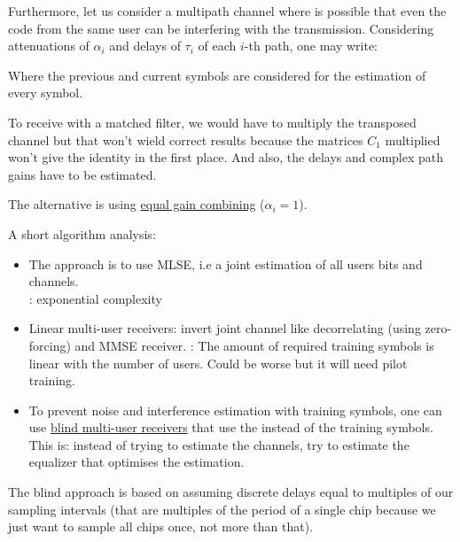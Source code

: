 \documentclass[12pt, a4paper]{article}
\begin{document}
\vspace{.5cm}

\par Furthermore, let us consider a multipath channel where is possible that even the code from the same user can be interfering with the transmission. Considering attenuations of $\alpha_i$ and delays of $\tau_i$ of each $i$-th path, one may write:


Where the previous and current symbols are considered for the estimation of every symbol.

\par To receive with a matched filter, we would have to multiply the transposed channel but that won't wield correct results because the matrices $C_1$ multiplied won't give the identity in the first place. And also, the delays and complex path gains have to be estimated.
\par The alternative is using \uline{equal gain combining} ($\alpha_i = 1$).

\par A short algorithm analysis:
\begin{itemize}
    \item The  approach is to use MLSE, i.e a joint estimation of all users bits and channels. \\
    : exponential complexity
    \item Linear multi-user receivers: invert joint channel like decorrelating (using zero-forcing) and MMSE receiver. 
    : The amount of required training symbols is linear with the number of users. Could be worse but it will need pilot training.
    \item To prevent noise and interference estimation with training symbols, one can use \uline{blind multi-user receivers} that use the  instead of the training symbols. This is: instead of trying to estimate the channels, try to estimate the equalizer that optimises the estimation.
\end{itemize}

\par The blind approach is based on assuming discrete delays equal to multiples of our sampling intervals (that are multiples of the period of a single chip because we just want to sample all chips once, not more than that).


\end{document}
